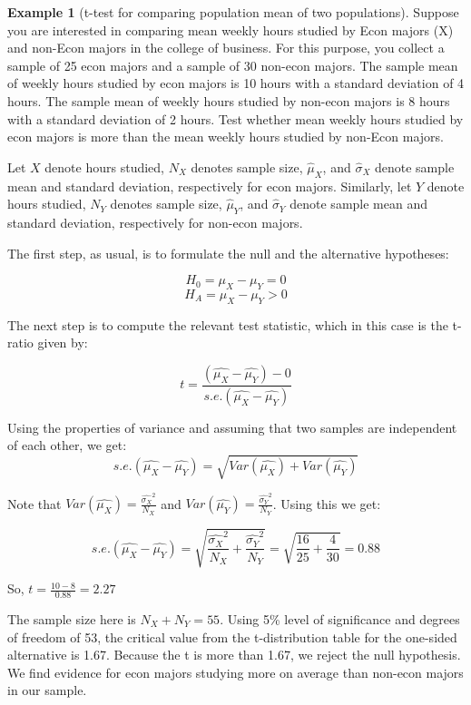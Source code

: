 \documentclass[
]{book}
\theoremstyle{definition}
\theoremstyle{definition}
\newtheorem{example}{Example}[chapter]
\theoremstyle{definition}
\theoremstyle{definition}
\theoremstyle{remark}
\begin{document}
\begin{example}[t-test for comparing population mean of two populations]
\protect\hypertarget{exm:unnamed-chunk-50}{}\label{exm:unnamed-chunk-50}Suppose you are interested in comparing mean weekly hours studied by Econ majors (X) and non-Econ majors in the college of business. For this purpose, you collect a sample of 25 econ majors and a sample of 30 non-econ majors. The sample mean of weekly hours studied by econ majors is 10 hours with a standard deviation of 4 hours. The sample mean of weekly hours studied by non-econ majors is 8 hours with a standard deviation of 2 hours. Test whether mean weekly hours studied by econ majors is more than the mean weekly hours studied by non-Econ majors.

Let \(X\) denote hours studied, \(N_X\) denotes sample size, \(\hat{\mu}_X\), and \(\hat{\sigma}_X\) denote sample mean and standard deviation, respectively for econ majors. Similarly, let \(Y\) denote hours studied, \(N_Y\) denotes sample size, \(\hat{\mu}_Y\), and \(\hat{\sigma}_Y\) denote sample mean and standard deviation, respectively for non-econ majors.

The first step, as usual, is to formulate the null and the alternative hypotheses:

\[H_0= \mu_X - \mu_Y = 0\]
\[H_A= \mu_X - \mu_Y > 0\]

The next step is to compute the relevant test statistic, which in this case is the t-ratio given by:

\[t= \frac{(\hat{\mu_X}-\hat{\mu_Y})-0}{s.e.(\hat{\mu_X}-\hat{\mu_Y})}\]

Using the properties of variance and assuming that two samples are independent of each other, we get:
\[s.e.(\hat{\mu_X}-\hat{\mu_Y})=\sqrt{Var(\hat{\mu_X})+Var(\hat{\mu_Y})}\]

Note that \(\displaystyle Var(\hat{\mu_X})= \frac{\widehat{\sigma_X}^2}{N_X}\) and \(\displaystyle Var(\hat{\mu_Y})= \frac{\widehat{\sigma_Y}^2}{N_Y}\). Using this we get:

\[s.e.(\hat{\mu_X}-\hat{\mu_Y})=\sqrt{\frac{\widehat{\sigma_X}^2}{N_X}+\frac{\widehat{\sigma_Y}^2}{N_Y}}=\sqrt{\frac{16}{25}+\frac{4}{30}}=0.88 \]

So, \(t=\displaystyle \frac{10-8}{0.88}=2.27\)

The sample size here is \(N_X+N_Y=55\). Using 5\% level of significance and degrees of freedom of 53, the critical value from the t-distribution table for the one-sided alternative is 1.67. Because the \textbar t\textbar{} is more than 1.67, we reject the null hypothesis. We find evidence for econ majors studying more on average than non-econ majors in our sample.
\end{example}
\end{document}
